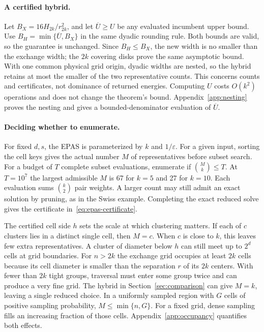 \documentclass[a4paper,12pt]{article}
\numberwithin{equation}{section}
\begin{document}
\paragraph*{A certified hybrid.}
Let $B_X=16H_{2k}/r_{2k}^2$, and let $\overline U\ge U$ be any evaluated incumbent upper bound.
Use $B_H=\min\{\overline U,B_X\}$ in the same dyadic rounding rule. Both bounds are valid, so the
guarantee is unchanged. Since $B_H\le B_X$, the new width is no smaller than the exchange width;
the $2k$ covering disks prove the same asymptotic bound. With one common physical grid origin,
dyadic widths are nested, so the hybrid retains at most the smaller of the two representative
counts. This concerns counts and certificates, not dominance of returned energies. Computing $U$
costs $O(k^2)$ operations and does not change the theorem's bound. Appendix~\ref{app:nesting}
proves the nesting and gives a bounded-denominator evaluation of $\overline U$.

\paragraph*{Deciding whether to enumerate.}
For fixed $d,s$, the EPAS is parameterized by $k$ and $1/\varepsilon$. For a given input, sorting
the cell keys gives the actual number $M$ of representatives before subset search. For a budget of $T$ complete subset evaluations,
enumerate if $\binom Mk\le T$. At $T=10^7$ the largest admissible $M$ is 67 for $k=5$ and 27 for $k=10$. Each evaluation sums
$\binom{k}{2}$ pair weights. A larger count may still admit an exact solution by pruning, as in
the Swiss example. Completing the exact reduced solve gives the certificate
in~\eqref{eq:epas-certificate}.

The certified cell side $h$ sets the scale at which clustering matters. If each of $c$ clusters
lies in a distinct single cell, then $M=c$. When $c$ is close to $k$, this leaves few extra
representatives. A cluster of diameter below $h$ can still meet up to $2^d$ cells at grid
boundaries. For $n>2k$ the exchange grid occupies at least $2k$ cells because its cell diameter is
smaller than the separation $r$ of its $2k$ centers. With fewer than $2k$ tight groups, traversal
must enter some group twice and can produce a very fine grid. The hybrid in
Section~\ref{sec:comparison} can give $M=k$, leaving a single reduced choice. In a uniformly
sampled region with $G$ cells of positive sampling probability, $M\le\min\{n,G\}$. For a fixed
grid, dense sampling fills an increasing fraction of those cells. Appendix~\ref{app:occupancy}
quantifies both effects.
\end{document}

